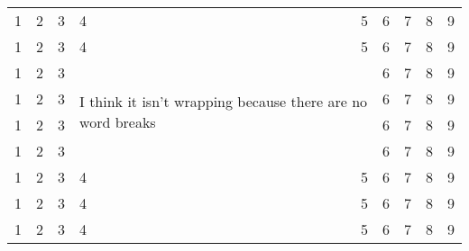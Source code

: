 \documentclass[]{article}
\begin{document}
\begin{tabular}{ccc p{1.5cm} r cccc}
1 & 2 & 3 & 4 & 5 & 6 & 7 & 8 & 9 \\
1 & 2 & 3 & 4 & 5 & 6 & 7 & 8 & 9 \\
1 & 2 & 3 & \multicolumn{2}{l}{\multirow{4}{3.4cm}{I think it isn't wrapping because there are no word breaks}} & 6 & 7 & 8 & 9 \\
1 & 2 & 3 & \multicolumn{2}{c}{} & 6 & 7 & 8 & 9 \\
1 & 2 & 3 & \multicolumn{2}{c}{} & 6 & 7 & 8 & 9 \\
1 & 2 & 3 & \multicolumn{2}{c}{} & 6 & 7 & 8 & 9 \\
1 & 2 & 3 & 4 & 5 & 6 & 7 & 8 & 9 \\
1 & 2 & 3 & 4 & 5 & 6 & 7 & 8 & 9 \\
1 & 2 & 3 & 4 & 5 & 6 & 7 & 8 & 9 \\
\end{tabular}
\end{document}
